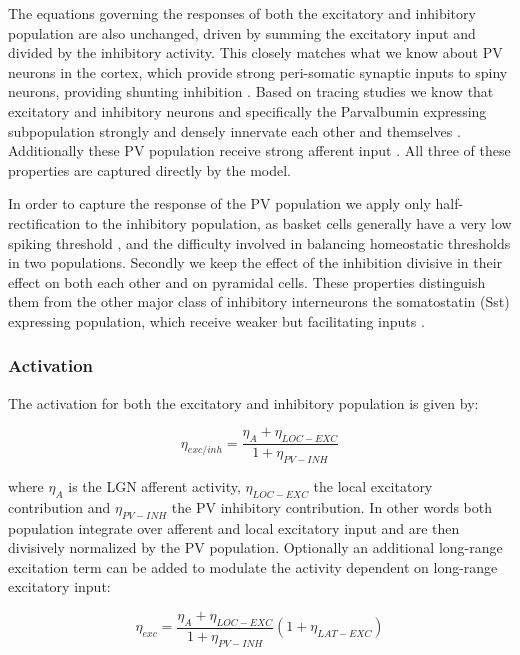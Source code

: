The equations governing the responses of both the excitatory and
inhibitory population are also unchanged, driven by summing the
excitatory input and divided by the inhibitory activity. This closely
matches what we know about PV neurons in the cortex, which provide
strong peri-somatic synaptic inputs to spiny neurons, providing
shunting inhibition \citep{Atallah2012, Wilson2012}. Based on tracing
studies we know that excitatory and inhibitory neurons and
specifically the Parvalbumin expressing subpopulation strongly and
densely innervate each other and themselves \citep{Buzas2001, Ma2011,
  Pfeffer2013}. Additionally these PV population receive strong
afferent input \citep{Burkhalter2008}. All three of these properties
are captured directly by the model.

In order to capture the response of the PV population we apply only
half-rectification to the inhibitory population, as basket cells
generally have a very low spiking threshold \citep{Ma2011}, and the
difficulty involved in balancing homeostatic thresholds in two
populations. Secondly we keep the effect of the inhibition divisive in
their effect on both each other and on pyramidal cells. These
properties distinguish them from the other major class of inhibitory
interneurons the somatostatin (Sst) expressing population, which
receive weaker but facilitating inputs
\citep{Beierlein2003,Bartley2008,Tan2008}.

\subsubsection{Activation}

The activation for both the excitatory and inhibitory population is
given by:

\begin{equation}
  \eta_{exc/inh} = \frac{\eta_{A} + \eta_{LOC-EXC}}{1 + \eta_{PV-INH}}
\end{equation}

where $\eta_{A}$ is the LGN afferent activity, $\eta_{LOC-EXC}$ the
local excitatory contribution and $\eta_{PV-INH}$ the PV inhibitory
contribution. In other words both population integrate over afferent
and local excitatory input and are then divisively normalized by the
PV population. Optionally an additional long-range excitation term can
be added to modulate the activity dependent on long-range excitatory
input:

\begin{equation}
  \eta_{exc} = \frac{\eta_{A} + \eta_{LOC-EXC}}{1 + \eta_{PV-INH}} (1+\eta_{LAT-EXC})
\end{equation}

